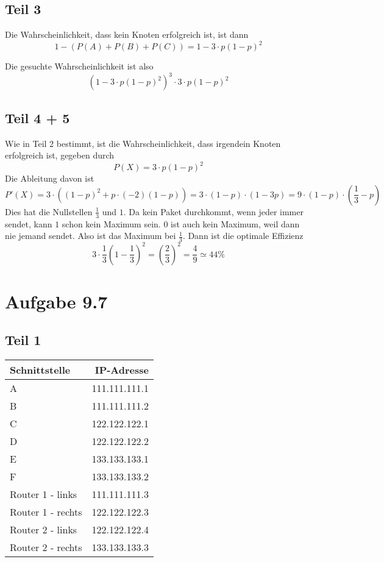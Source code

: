 \documentclass[10pt,a4paper]{article}
\begin{document}
\subsection{Teil 3}

Die Wahrscheinlichkeit, dass kein Knoten erfolgreich ist, ist dann
\begin{equation}
  1 - (P(A) + P(B) + P(C)) = 1 - 3 \cdot p(1 - p)^{2}
\end{equation}

Die gesuchte Wahrscheinlichkeit ist also
\begin{equation}
  \left( 1 - 3 \cdot p(1 - p)^{2} \right)^{3} \cdot 3 \cdot p(1 - p)^{2}
\end{equation}

\subsection{Teil 4 + 5}

Wie in Teil 2 bestimmt, ist die Wahrscheinlichkeit, dass irgendein Knoten
erfolgreich ist, gegeben durch
\begin{equation}
  P(X) = 3 \cdot p(1 - p)^{2}
\end{equation}
Die Ableitung davon ist
\begin{equation}
  P'(X) = 3 \cdot \left( (1 - p)^{2} + p \cdot (-2)(1 - p) \right) = 3 \cdot (1 - p) \cdot (1 - 3p) = 9 \cdot (1 - p) \cdot (\frac{1}{3} - p)
\end{equation}
Dies hat die Nullstellen $\frac{1}{3}$ und $1$. Da kein Paket durchkommt, wenn
jeder immer sendet, kann $1$ schon kein Maximum sein. $0$ ist auch kein Maximum,
weil dann nie jemand sendet. Also ist das Maximum bei $\frac{1}{3}$. Dann ist
die optimale Effizienz
\begin{equation}
  3 \cdot \frac{1}{3}(1 - \frac{1}{3})^{2} = \left( \frac{2}{3} \right)^{2} = \frac{4}{9} \simeq 44\%
\end{equation}

\section{Aufgabe 9.7}

\subsection{Teil 1}

\begin{tabular}{l|r}
Schnittstelle & IP-Adresse\\
\hline
A & 111.111.111.1\\
B & 111.111.111.2\\
C & 122.122.122.1\\
D & 122.122.122.2\\
E & 133.133.133.1\\
F & 133.133.133.2\\
Router 1 - links & 111.111.111.3\\
Router 1 - rechts & 122.122.122.3\\
Router 2 - links & 122.122.122.4\\
Router 2 - rechts & 133.133.133.3\\
\end{tabular}
\end{document}
